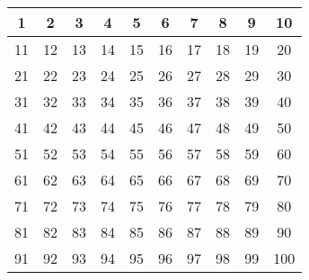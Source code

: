 \begin{center}
\begin{tabular}{|c|c|c|c|c|c|c|c|c|c|}
\hline
1 & 2 & 3 & 4 & 5 & 6 & 7 & 8 & 9 & 10 \\
\hline
11 & 12 & 13 & 14 & 15 & 16 & 17 & 18 & 19 & 20 \\
\hline
21 & 22 & 23 & 24 & 25 & 26 & 27 & 28 & 29 & 30 \\
\hline
31 & 32 & 33 & 34 & 35 & 36 & 37 & 38 & 39 & 40 \\
\hline
41 & 42 & 43 & 44 & 45 & 46 & 47 & 48 & 49 & 50 \\
\hline
51 & 52 & 53 & 54 & 55 & 56 & 57 & 58 & 59 & 60 \\
\hline
61 & 62 & 63 & 64 & 65 & 66 & 67 & 68 & 69 & 70 \\
\hline
71 & 72 & 73 & 74 & 75 & 76 & 77 & 78 & 79 & 80 \\
\hline
81 & 82 & 83 & 84 & 85 & 86 & 87 & 88 & 89 & 90 \\
\hline
91 & 92 & 93 & 94 & 95 & 96 & 97 & 98 & 99 & 100 \\
\hline
\end{tabular}
\end{center}

